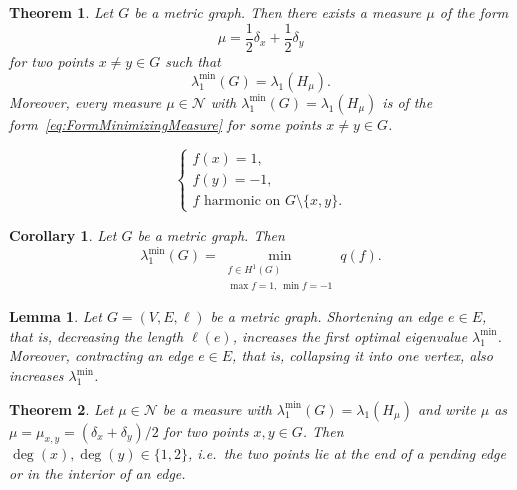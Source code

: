 \documentclass[10pt,a4paper]{amsart}
\newtheorem{thm}{Theorem}
\newtheorem{cor}{Corollary}
\newtheorem{lem}{Lemma}
\newcommand{\cN}{\mathcal{N}}
\begin{document}
\begin{thm} \label{thm: characerisation of lambda1}
	Let $G$ be a metric graph. Then there exists a measure $\mu$ of the form
	\begin{equation} \label{eq:FormMinimizingMeasure}
		\mu = \frac{1}{2}\delta_x + \frac{1}{2} \delta_y
	\end{equation}
	for two points $x\neq y \in G$ such that
	\[
	\lambda_1^{\min}(G) = \lambda_1(H_\mu).
	\]
	Moreover, every measure $\mu\in \cN$ with $\lambda_1^{\min}(G) = \lambda_1(H_\mu)$ is of the form~\eqref{eq:FormMinimizingMeasure} for some points $x\neq  y \in G$.
\end{thm}

\begin{equation} \label{eq:Definitionfxy}
	\begin{cases}
		f(x)=1,    \\
		f(y) = -1, \\
		f \text{ harmonic}  \text{ on }G\setminus\{x,y\}.
	\end{cases}
\end{equation}

\begin{cor}\label{Cor: Alternative charakterization of lambda 1}
	Let $G$ be a metric graph. Then
	\[
	\lambda_{1}^{\min}(G) = \min_{\substack{f \in H^1(G) \\ \max f =1, \, \min f= -1}}q(f).
	\]
\end{cor}

\begin{lem} \label{lem:DecreasingEdgeLength}
	Let $G =(V,E, \ell)$ be a metric graph. Shortening an edge $e \in E$, that is, decreasing the length $\ell(e)$, increases the first optimal eigenvalue $\lambda_1^{\min}$. Moreover, contracting an edge $e \in E$, that is, collapsing it into one vertex, also increases $\lambda_1^{\min}$.
\end{lem}

\begin{thm}\label{thm: points avoid vertices}
	Let $\mu \in \cN$ be a measure with $\lambda_{1}^{\min}(G)=\lambda_1(H_{\mu})$ and write $\mu$ as $\mu = \mu_{x,y} = (\delta_x + \delta_y)/2$ for two points $x, y \in G$. Then $\deg(x), \deg(y) \in \{1,2\}$, i.e.~the two points lie at the end of a pending edge or in the interior of an edge.  
\end{thm}
\end{document}
